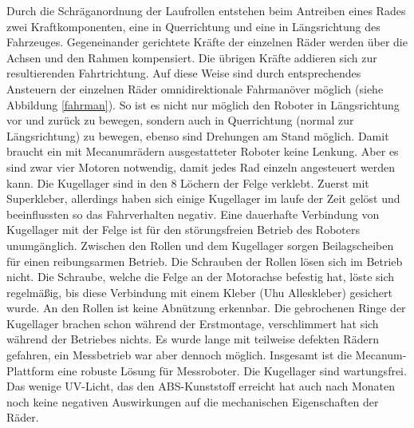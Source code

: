 \documentclass[a4paper,bibtotoc,oneside]{scrbook}
\begin{document}
Durch die Schräganordnung der Laufrollen entstehen beim Antreiben eines Rades zwei Kraftkomponenten, eine in Querrichtung und eine in Längsrichtung des Fahrzeuges. Gegeneinander gerichtete Kräfte der einzelnen Räder werden über die Achsen und den Rahmen kompensiert. Die übrigen Kräfte addieren sich zur resultierenden Fahrtrichtung. Auf diese Weise sind durch entsprechendes Ansteuern der einzelnen Räder omnidirektionale Fahrmanöver möglich (siehe Abbildung \ref{fahrman}). So ist es nicht nur möglich den Roboter in Längsrichtung vor und zurück zu bewegen, sondern auch in Querrichtung (normal zur Längsrichtung) zu bewegen, ebenso sind Drehungen am Stand möglich. Damit braucht ein mit Mecanumrädern ausgestatteter Roboter keine Lenkung. Aber es sind zwar vier Motoren notwendig, damit jedes Rad einzeln angesteuert werden kann.   
Die Kugellager sind in den 8 Löchern der Felge verklebt. Zuerst mit Superkleber, allerdings haben sich einige Kugellager im laufe der Zeit gelöst und beeinflussten so das Fahrverhalten negativ. Eine dauerhafte Verbindung von Kugellager mit der Felge ist für den störungsfreien Betrieb des Roboters unumgänglich. 
Zwischen den Rollen und dem Kugellager sorgen Beilagscheiben für einen reibungsarmen Betrieb. 
Die Schrauben der Rollen lösen sich im Betrieb nicht. Die Schraube, welche die Felge an der Motorachse befestig hat, löste sich regelmäßig, bis diese Verbindung mit einem Kleber (Uhu Alleskleber) gesichert wurde.
An den Rollen ist keine Abnützung erkennbar. Die gebrochenen Ringe der Kugellager brachen schon während der Erstmontage, verschlimmert hat sich während der Betriebes nichts.
Es wurde lange mit teilweise defekten Rädern gefahren, ein Messbetrieb war aber dennoch möglich. Insgesamt ist die Mecanum-Plattform eine robuste Lösung für Messroboter.
Die Kugellager sind wartungsfrei. Das wenige UV-Licht, das den ABS-Kunststoff erreicht hat auch nach Monaten noch keine negativen Auswirkungen auf die mechanischen Eigenschaften der Räder.
\end{document}
